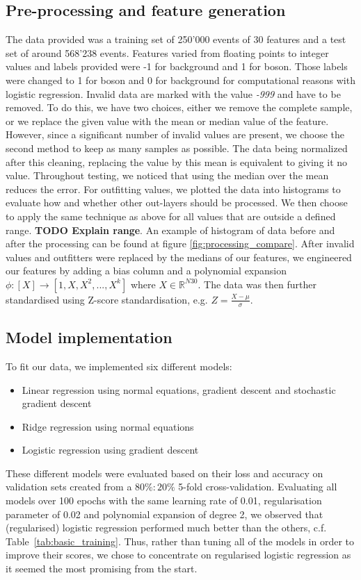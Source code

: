 \documentclass[10pt,conference,compsocconf]{IEEEtran}
\begin{document}
  \subsection{Pre-processing and feature generation}\label{subsec:pre-proc}
  The data provided was a training set of 250'000 events of 30 features and a test set of around 568'238 events. Features varied from floating points to integer values and labels provided were -1 for background and 1 for boson. Those labels were changed to 1 for boson and 0 for background for computational reasons with logistic regression. Invalid data are marked with the value \textit{-999} and have to be removed. To do this, we have two choices, either we remove the complete sample, or we replace the given value with the mean or median value of the feature. However, since a significant number of invalid values are present, we choose the second method to keep as many samples as possible. The data being normalized after this cleaning, replacing the value by this mean is equivalent to giving it no value. Throughout testing, we noticed that using the median over the mean reduces the error. For outfitting values, we plotted the data into histograms to evaluate how and whether other out-layers should be processed. We then choose to apply the same technique as above for all values that are outside a defined range. \textbf{TODO Explain range}. An example of histogram of data before and after the processing can be found at figure \ref{fig:processing_compare}.
    After invalid values and outfitters were replaced by the medians of our features, we engineered our features by adding a bias column and a polynomial expansion $\phi:[X]\rightarrow [1, X, X^2,...,X^k]$ where $X\in \mathbb{R}^{N30}$. The data was then further standardised using Z-score standardisation, e.g. $Z = \frac{X - \mu}{\sigma}$.
    
  \subsection{
  Model implementation
  }
  To fit our data, we implemented six different models: 
    \begin{itemize}
        \item Linear regression using normal equations, gradient descent and stochastic gradient descent 
        \item Ridge regression using normal equations
        \item Logistic regression using gradient descent 
    \end{itemize}
    These different models were evaluated based on their loss and accuracy on validation sets created from a $80\%:20\%$ 5-fold cross-validation. Evaluating all models over 100 epochs with the same learning rate of 0.01, regularisation parameter of 0.02 and polynomial expansion of degree 2, we observed that (regularised) logistic regression performed much better than the others, c.f. Table~\ref{tab:basic_training}. Thus, rather than tuning all of the models in order to improve their scores, we chose to concentrate on regularised logistic regression as it seemed the most promising from the start. 
    
\end{document}
